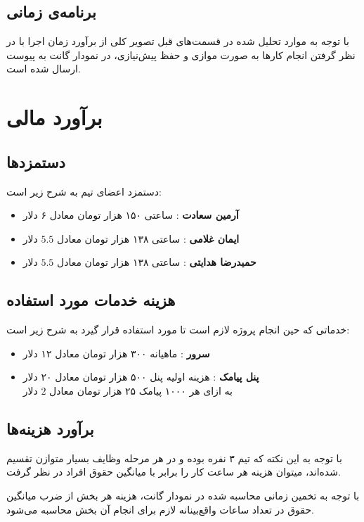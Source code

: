 \renewcommand{\arraystretch}{1.7}

\subsection{برنامه‌ی زمانی}
با توجه به موارد تحلیل شده در قسمت‌های قبل تصویر کلی از برآورد زمان اجرا با در نظر گرفتن انجام کار‌ها به صورت موازی و حفظ پیش‌نیازی، در نمودار گانت
به پیوست ارسال شده است.

\section{برآورد مالی}
\subsection{دستمزدها}
دستمزد اعضای تیم به شرح زیر است:
\begin{itemize}
	\item 
	\textbf{آرمین سعادت}
	: ساعتی ۱۵۰ هزار تومان معادل ۶ دلار
	\item 
	\textbf{ایمان غلامی}
	: ساعتی ۱۳۸ هزار تومان معادل 
	$5.5$
	دلار
	\item 
	\textbf{حمیدرضا هدایتی}
	: ساعتی ۱۳۸ هزار تومان معادل 
	$5.5$
	دلار
\end{itemize}

\subsection{هزینه خدمات مورد استفاده}
خدماتی که حین انجام پروژه لازم است تا مورد استفاده قرار گیرد به شرح زیر است:
\begin{itemize}
	\item 
	\textbf{سرور}
	: ماهیانه ۳۰۰ هزار تومان معادل ۱۲ دلار
	\item 
	\textbf{پنل پیامک}
	:
	هزینه اولیه پنل ۵۰۰ هزار تومان معادل ۲۰ دلار
	\\
	به ازای هر ۱۰۰۰ پیامک ۲۵ هزار تومان معادل 
	$2$
	دلار

\end{itemize}

\subsection{برآورد هزینه‌ها}
با توجه به این نکته که تیم ۳ نفره بوده و در هر مرحله وظایف بسیار متوازن تقسیم شده‌اند، میتوان هزینه هر ساعت کار را برابر با میانگین حقوق افراد در نظر گرفت.

با توجه به تخمین زمانی محاسبه شده در نمودار گانت، هزینه هر بخش از ضرب میانگین حقوق در تعداد ساعات واقع‌بینانه لازم برای انجام آن بخش محاسبه می‌شود.

